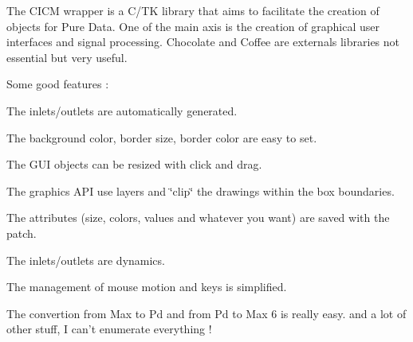 The C\-I\-C\-M wrapper is a C/\-T\-K library that aims to facilitate the creation of objects for Pure Data. One of the main axis is the creation of graphical user interfaces and signal processing. Chocolate and Coffee are externals libraries not essential but very useful.

Some good features \-:
\begin{DoxyItemize}
\item The inlets/outlets are automatically generated.
\item The background color, border size, border color are easy to set.
\item The G\-U\-I objects can be resized with click and drag.
\item The graphics A\-P\-I use layers and \char`\"{}clip\char`\"{} the drawings within the box boundaries.
\item The attributes (size, colors, values and whatever you want) are saved with the patch.
\item The inlets/outlets are dynamics.
\item The management of mouse motion and keys is simplified.
\item The convertion from Max to Pd and from Pd to Max 6 is really easy. and a lot of other stuff, I can't enumerate everything ! 
\end{DoxyItemize}